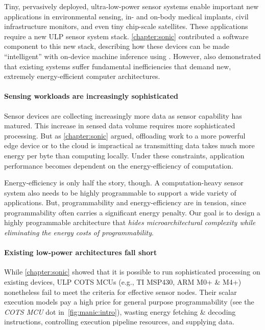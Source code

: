 Tiny, pervasively deployed, ultra-low-power sensor systems
enable important new applications in environmental sensing, in- and on-body
medical implants, civil infrastructure monitors, and even tiny chip-scale
satellites.
% 
These applications require a new ULP sensor system stack.
% 
\autoref{chapter:sonic} contributed a software component to this new stack, describing how these devices can be made ``intelligent'' with on-device machine inference using \sonic.
% 
However, \sonic also demonstrated that existing systems suffer fundamental
inefficiencies that demand new, extremely energy-efficient computer
architectures. 

\paragraph{Sensing workloads are increasingly sophisticated} 
Sensor devices are collecting increasingly more data as sensor capability has matured.
% 
This increase in sensed data volume requires more sophisticated processing.
% 
But as \autoref{chapter:sonic} argued, offloading work to a more powerful edge device or to the cloud is impractical as transmitting data takes much more energy per byte than computing locally.
%
Under these constraints, application performance becomes dependent on the energy-efficiency of computation.
%

Energy-efficiency is only half the story, though.
% 
A computation-heavy sensor system also needs to be highly programmable to support a wide variety of applications.
% 
But, programmability and energy-efficiency are in tension, since programmability often carries a significant energy penalty.
% 
Our goal is to design a highly programmable architecture that \emph{hides microarchitectural complexity while eliminating the energy costs of programmability}.

\paragraph{Existing low-power architectures fall short}
While \autoref{chapter:sonic} showed that it is possible to run sophisticated processing on existing devices, ULP COTS MCUs (e.g., TI MSP430, ARM M0+ \& M4+) nonetheless fail to meet the criteria for effective sensor nodes.
% 
Their scalar execution models pay a high price for general purpose programmability
(see the \textit{COTS MCU} dot in~\autoref{fig:manic:intro}), wasting energy fetching \& decoding instructions, controlling execution pipeline resources, and supplying data.


